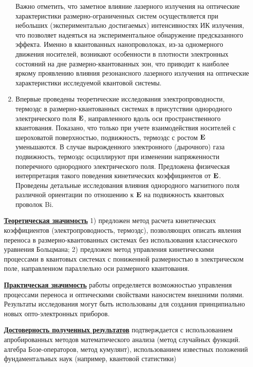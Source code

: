 \begin{enumerate}
	Важно отметить, что заметное влияние лазерного излучения на оптические характеристики размерно-ограниченных систем осуществляется при небольших (экспериментально достигаемых) интенсивностях ИК излучения, что позволяет надеяться на экспериментальное обнаружение предсказанного эффекта. Именно в квантованных нанопроволоках, из-за одномерного движения носителей, возникают особенности в плотности электронных состояний на дне размерно-квантованных зон, что приводит к наиболее яркому проявлению влияния резонансного лазерного излучения на оптические характеристики исследуемой квантовой системы.
	\item Впервые проведены теоретические исследования электропроводности, термоэдс в размерно-квантованных системах в присутствии однородного электрического поля $\boldsymbol{\mathbf{E}}$, направленного вдоль оси пространственного квантования. 
	Показано, что только при учете взаимодействия носителей с шероховатой поверхностью, подвижность, термоэдс с ростом $\boldsymbol{\mathbf{E}}$ уменьшаются. В случае вырожденного электронного (дырочного) газа подвижность, термоэдс осциллируют при изменении напряженности поперечного однородного электрического поля. Предложена физическая интерпретация такого поведения кинетических коэффициентов от  $\boldsymbol{\mathbf{E}}$. Проведены детальные исследования влияния однородного магнитного поля различной ориентации по отношению к $\boldsymbol{\mathbf{E}}$ на подвижность квантовых проволок Bi.
\end{enumerate}

\underline{\textbf{Теоретическая значимость}} 1) предложен метод расчета кинетических коэффициентов (электропроводность, термоэдс), позволяющих описать явления переноса в размерно-квантованных системах без использования классического уравнения Больцмана; 2) предложен метод управления кинетическими процессами в квантовых системах с пониженной размерностью в электрическом поле, направленном параллельно оси размерного квантования.

\underline{\textbf{Практическая значимость}} работы определяется возможностью управления процессами переноса и оптическими свойствами наносистем внешними полями. Результаты исследования могут быть использованы для создания принципиально новых опто-электронных приборов.

\underline{\textbf{Достоверность полученных результатов}} подтверждается с использованием апробированных методов математического анализа (метод случайных функций. алгебра Бозе-операторов, метод кумулянт), использованием известных положений фундаментальных наук (например, квантовой статистики)

